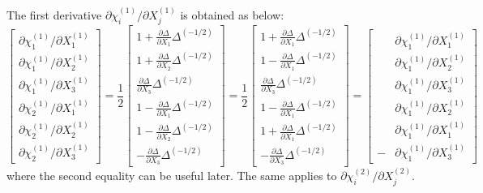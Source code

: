 \documentclass[12pt]{amsart}
\begin{document}
The first derivative $\partial\chi^{(1)}_i/\partial X^{(1)}_j$  is obtained as below:
\begin{equation}
  \label{eq:dchi_dx_1}
  \begin{bmatrix}
    \partial\chi^{(1)}_1/\partial X^{(1)}_1\\
    \partial\chi^{(1)}_1/\partial X^{(1)}_2\\
    \partial\chi^{(1)}_1/\partial X^{(1)}_3\\
    \partial\chi^{(1)}_2/\partial X^{(1)}_1\\
    \partial\chi^{(1)}_2/\partial X^{(1)}_2\\
    \partial\chi^{(1)}_2/\partial X^{(1)}_3
  \end{bmatrix}
  =
  \frac{1}{2}
  \begin{bmatrix}
     1 +  \frac{\partial\Delta}{\partial X_1} \Delta^{(-1/2)}   \\
     1 +  \frac{\partial\Delta}{\partial X_2} \Delta^{(-1/2)}   \\
      \frac{\partial\Delta}{\partial X_3} \Delta^{(-1/2)}   \\
     1 -  \frac{\partial\Delta}{\partial X_1} \Delta^{(-1/2)}   \\
     1 -  \frac{\partial\Delta}{\partial X_2} \Delta^{(-1/2)}   \\
     -\frac{\partial\Delta}{\partial X_3} \Delta^{(-1/2)}
  \end{bmatrix}
  =
  \frac{1}{2}
  \begin{bmatrix}
     1 +  \frac{\partial\Delta}{\partial X_1} \Delta^{(-1/2)}   \\
     1 -  \frac{\partial\Delta}{\partial X_1} \Delta^{(-1/2)}   \\
      \frac{\partial\Delta}{\partial X_3} \Delta^{(-1/2)}   \\
     1 -  \frac{\partial\Delta}{\partial X_1} \Delta^{(-1/2)}   \\
     1 +  \frac{\partial\Delta}{\partial X_1} \Delta^{(-1/2)}   \\
     -\frac{\partial\Delta}{\partial X_3} \Delta^{(-1/2)}
  \end{bmatrix}
  =
  \begin{bmatrix}
     &\partial\chi^{(1)}_1/\partial X^{(1)}_1\\
     &\partial\chi^{(1)}_1/\partial X^{(1)}_2\\
     &\partial\chi^{(1)}_1/\partial X^{(1)}_3\\
     &\partial\chi^{(1)}_1/\partial X^{(1)}_2\\
     &\partial\chi^{(1)}_1/\partial X^{(1)}_1\\
    -&\partial\chi^{(1)}_1/\partial X^{(1)}_3
  \end{bmatrix}
\end{equation}
where the second equality can be useful later.
The same applies to $ \partial\chi^{(2)}_i/\partial X^{(2)}_j$.
\end{document}

